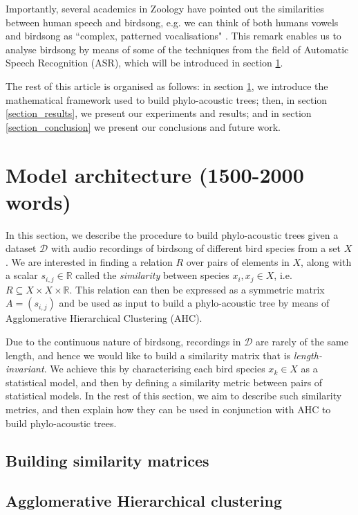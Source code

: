 \documentclass[pdftex,11pt,a4paper]{article}
\theoremstyle{definition}
\theoremstyle{remark}
\begin{document}
\par Importantly, several academics in Zoology have pointed out the similarities between human speech and birdsong, e.g. we can think of both humans vowels and birdsong as ``complex, patterned vocalisations" \cite{Berwick2013,Naguib2014}. This remark enables us to analyse birdsong by means of some of the techniques from the field of Automatic Speech Recognition (ASR), which will be introduced in section \ref{section_model}. 
\par The rest of this article is organised as follows: in section \ref{section_model}, we introduce the mathematical framework used to build phylo-acoustic trees; then, in section \ref{section_results}, we present our experiments and results; and in section \ref{section_conclusion} we present our conclusions and future work.

\section{Model architecture (1500-2000 words)}
\label{section_model}
In this section, we describe the procedure to build phylo-acoustic trees given a dataset $\mathcal{D}$ with audio recordings of birdsong of different bird species from a set $X$. We are interested in finding a relation $R$ over pairs of elements in $X$, along with a scalar $s_{i, j} \in \mathbb{R}$ called the \emph{similarity} between species $x_i, x_j \in X$, i.e. $R \subseteq X \times X \times \mathbb{R}$. This relation can then be expressed as a symmetric matrix $A = (s_{i,j})$ and be used as input to build a phylo-acoustic tree by means of Agglomerative Hierarchical Clustering (AHC). 
\par Due to the continuous nature of birdsong, recordings in $\mathcal{D}$ are rarely of the same length, and hence we would like to build a similarity matrix that is \emph{length-invariant}. We achieve this by characterising each bird species $x_k \in X$ as a statistical model, and then by defining a similarity metric between pairs of statistical models. In the rest of this section, we aim to describe such similarity metrics, and then explain how they can be used in conjunction with AHC to build phylo-acoustic trees.

\subsection{Building similarity matrices}


\subsection{Agglomerative Hierarchical clustering}
\end{document}
